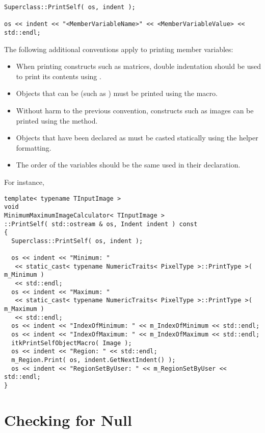 \small
\begin{verbatim}
Superclass::PrintSelf( os, indent );

os << indent << "<MemberVariableName>" << <MemberVariableValue> << std::endl;
\end{verbatim}
\normalsize

The following additional conventions apply to printing member variables:
\begin{itemize}
\item When printing constructs such as matrices, double indentation should be
used to print its contents using .
\item Objects that can be  (such as ) must be
printed using the  macro.
\item Without harm to the previous convention, constructs such as images can
be printed using the  method.
\item Objects that have been declared as  must be casted
statically using the  helper
formatting.
\item The order of the variables should be the same used in their declaration.
\end{itemize}

For instance,

\small
\begin{verbatim}
template< typename TInputImage >
void
MinimumMaximumImageCalculator< TInputImage >
::PrintSelf( std::ostream & os, Indent indent ) const
{
  Superclass::PrintSelf( os, indent );

  os << indent << "Minimum: "
   << static_cast< typename NumericTraits< PixelType >::PrintType >( m_Minimum )
   << std::endl;
  os << indent << "Maximum: "
   << static_cast< typename NumericTraits< PixelType >::PrintType >( m_Maximum )
   << std::endl;
  os << indent << "IndexOfMinimum: " << m_IndexOfMinimum << std::endl;
  os << indent << "IndexOfMaximum: " << m_IndexOfMaximum << std::endl;
  itkPrintSelfObjectMacro( Image );
  os << indent << "Region: " << std::endl;
  m_Region.Print( os, indent.GetNextIndent() );
  os << indent << "RegionSetByUser: " << m_RegionSetByUser << std::endl;
}
\end{verbatim}
\normalsize


\section{Checking for Null}
\label{sec:CheckingForNull}

